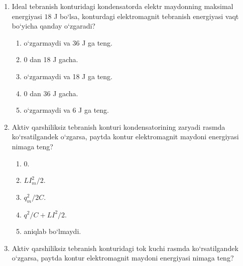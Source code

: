 \begin{enumerate}
\item Ideal tebranish konturidagi kondensatorda elektr maydonning maksimal energiyasi $18$ J bo‘lsa, konturdagi elektromagnit tebranish energiyasi vaqt bo‘yicha qanday o‘zgaradi?
\begin{enumerate}[label=\Alph*)]
\item o‘zgarmaydi va $36$ J ga teng.
\item 0 dan 18 J gacha.
\item o‘zgarmaydi va 18 J ga teng.
\item 0 dan 36 J gacha.
\item o‘zgarmaydi va 6 J ga teng.
\end{enumerate}

\item Aktiv qarshiliksiz tebranish konturi kondensatorining zaryadi rasmda ko‘rsatilgandek o‘zgarsa, paytda kontur elektromagnit maydoni energiyasi nimaga teng?


\begin{enumerate}[label=\Alph*)]
\item 0.
\item $LI_m^2/2$.
\item $q_m^2/2C$.
\item $q^2/C+LI^2/2$.
\item aniqlab bo‘lmaydi.
\end{enumerate}

\item Aktiv qarshiliksiz tebranish konturidagi tok kuchi rasmda ko‘rsatilgandek o‘zgarsa, paytda kontur elektromagnit maydoni energiyasi nimaga teng?


\end{enumerate}
